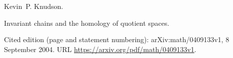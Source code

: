 Kevin~P. Knudson.

\newblock Invariant chains and the homology of quotient spaces.

\newblock Cited edition (page and statement numbering): arXiv:math/0409133v1, 8 September 2004.
\newblock URL \url{https://arxiv.org/pdf/math/0409133v1}.

